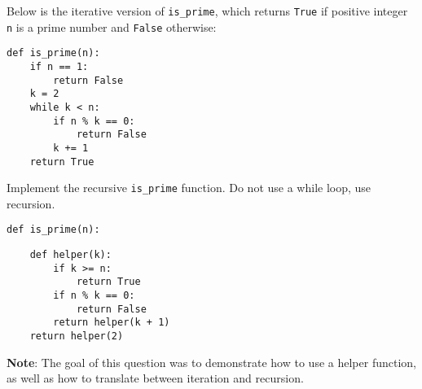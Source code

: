 \question Below is the iterative version of {\tt is\_prime}, which returns 
{\tt True} if positive integer {\tt n} is a prime number and {\tt False} otherwise: 
\begin{lstlisting}
def is_prime(n):
    if n == 1: 
        return False
    k = 2
    while k < n:
        if n % k == 0: 
            return False
        k += 1 
    return True
\end{lstlisting}

Implement the recursive {\tt is\_prime} function. Do not use a while loop, use recursion.

\begin{lstlisting}
def is_prime(n):
\end{lstlisting}

\begin{solution}[2in]
\begin{lstlisting}
    def helper(k):
        if k >= n:
            return True
        if n % k == 0:
            return False
        return helper(k + 1)
    return helper(2)
\end{lstlisting}
\textbf{Note}: The goal of this question was to demonstrate how to use a helper 
function, as well as how to translate between iteration and recursion.
\end{solution}

\iffalse
\question Is there a math trick you can apply to {\tt is\_prime} so it runs faster?
\begin{solution}[2.0in]
If {\tt n} is prime, it can be factored into at least two factors. If both of the factors 
are greater than the $\sqrt{n}$, then their product is greater than {\tt n}. Therefore, 
one of the factors must be less than or equal to $\sqrt{n}$.
\begin{lstlisting}
    def helper(k):
        if k > math.sqrt(n):
            return True
        if n % k == 0:
            return False
        return helper(k + 1)
    return helper(2)
\end{lstlisting}
\textbf{Note}: Don't forget to import {\tt math}.
\end{solution}
\fi
